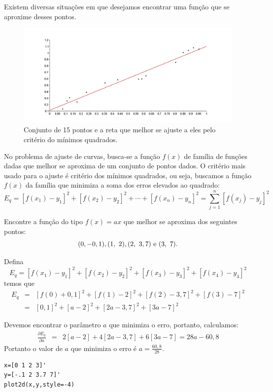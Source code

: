 \documentclass[main.tex]{subfiles}
\begin{document}
Existem diversas situações em que desejamos encontrar uma função que se aproxime desses pontos.
\begin{figure}[htp]
\begin{center}
\includegraphics[width=15cm,angle=0]{./cap_aproxfun/pics/ajuste_reta}
{\caption{Conjunto de 15 pontos e a reta que melhor se ajuste a eles pelo critério do mínimos quadrados.}}
\end{center}
\end{figure}

No problema de ajuste de curvas, busca-se a função $f(x)$ de família de funções dadas que melhor se aproxima de um conjunto de pontos dados. O critério mais usado para o ajuste é critério dos mínimos quadrados, ou seja, buscamos a função $f(x)$ da família que minimiza a soma dos erros elevados ao quadrado:
$$E_q=\left[f(x_1)-y_1\right]^2+\left[f(x_2)-y_2\right]^2+\cdots +\left[f(x_n)-y_n\right]^2=\sum_{j=1}^n \left[f(x_j)-y_j\right]^2$$

\begin{ex} Encontre a função do tipo $f(x)=ax$ que melhor se aproxima dos seguintes pontos:
  \begin{equation*}
    (0,-0,1), (1,~2), (2,~3,7) ~ \hbox{e} ~(3,~7).  
  \end{equation*}
\end{ex}
\begin{sol}
Defina $$E_q=[f(x_1)-y_1]^2+[f(x_2)-y_2]^2+[f(x_3)-y_3]^2+[f(x_4)-y_4]^2$$
temos que
\begin{eqnarray*}
E_q&=&[f(0)+0,1]^2+[f(1)-2]^2+[f(2)-3,7]^2+[f(3)-7]^2\\
&=&[0,1]^2+[a-2]^2+[2a-3,7]^2+[3a-7]^2
\end{eqnarray*}

Devemos encontrar o parâmetro $a$ que minimiza o erro, portanto, calculamos:
\begin{eqnarray*}
\frac{\partial E_q}{\partial a}&=&2[a-2]+4[2a-3,7]+6[3a-7]=28a-60,8
\end{eqnarray*}
Portanto o valor de $a$ que minimiza o erro é $a=\frac{60,8}{28}$.
\ifisscilab
\begin{verbatim}
x=[0 1 2 3]'
y=[-.1 2 3.7 7]'
plot2d(x,y,style=-4)
\end{verbatim}
\fi
\end{sol}
\end{document}

